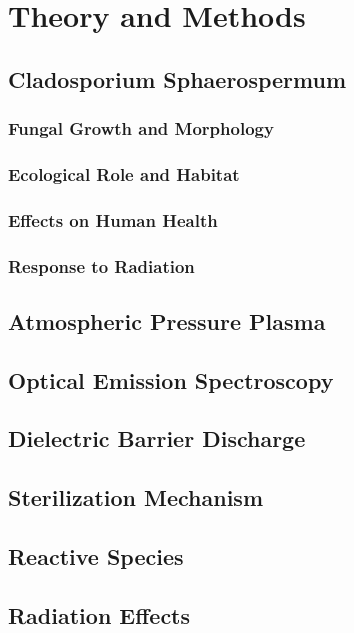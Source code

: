 \chapter{Theory and Methods}
\label{chap:theory}

\section{Cladosporium Sphaerospermum}

\subsection{Fungal Growth and Morphology}
\subsection{Ecological Role and Habitat}
\subsection{Effects on Human Health}
\subsection{Response to Radiation}

\section{Atmospheric Pressure Plasma}
\section{Optical Emission Spectroscopy}
\section{Dielectric Barrier Discharge}

\section{Sterilization Mechanism}
\section{Reactive Species}
\section{Radiation Effects}